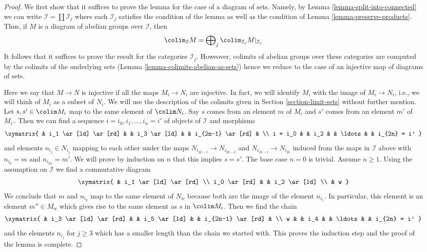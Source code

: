 \begin{proof}
We first show that it suffices to prove the lemma for the case of
a diagram of sets. Namely, by Lemma \ref{lemma-split-into-connected}
we can write $\mathcal{I} = \coprod \mathcal{I}_j$ where each
$\mathcal{I}_j$ satisfies the condition of the lemma as well as the
condition of Lemma \ref{lemma-preserve-products}.
Thus, if $M$ is a diagram of abelian groups over $\mathcal{I}$, then
$$
\colim_\mathcal{I} M =
\bigoplus\nolimits_j \colim_{\mathcal{I}_j} M|_{\mathcal{I}_j}
$$
It follows that it suffices to prove the result for the categories
$\mathcal{I}_j$. Howeover, colimits of abelian groups over these categories 
are computed by the colimits of the underlying sets
(Lemma \ref{lemma-colimits-abelian-as-sets})
hence we reduce to the case of an injective map of diagrams of sets.

\medskip\noindent
Here we say that $M \to N$ is injective if all the maps $M_i \to N_i$
are injective. In fact, we will identify $M_i$ with the image of
$M_i \to N_i$, i.e., we will think of $M_i$ as a subset of $N_i$.
We will use the description of the colimits given in
Section \ref{section-limit-sets} without further mention.
Let $s, s' \in \colim M_i$ map to the same element of $\colim N_i$.
Say $s$ comes from an element $m$ of $M_i$ and $s'$ comes from an
element $m'$ of $M_{i'}$. Then we can find a sequence
$i = i_0, i_1, \ldots, i_n = i'$ of objects of $\mathcal{I}$
and morphisms
$$
\xymatrix{
&
i_1 \ar[ld] \ar[rd] & &
i_3 \ar[ld] & &
i_{2n-1} \ar[rd] & \\
i = i_0 & &
i_2 & &
\ldots & &
i_{2n} = i'
}
$$
and elements $n_{i_j} \in N_{i_j}$ mapping to each other under
the maps $N_{i_{2k-1}} \to N_{i_{2k-2}}$ and $N_{i_{2k-1}}
\to N_{i_{2k}}$ induced from the maps in $\mathcal{I}$ above
with $n_{i_0} = m$ and $n_{i_{2n}} = m'$. We will prove by induction
on $n$ that this implies $s = s'$. The base case $n = 0$ is trivial.
Assume $n \geq 1$. Using the assumption on $\mathcal{I}$
we find a commutative diagram
$$
\xymatrix{
& i_1 \ar[ld] \ar[rd] \\
i_0 \ar[rd] & & i_2 \ar[ld] \\
& w
}
$$
We conclude that $m$ and $n_{i_2}$ map to the same element of $N_w$
because both are the image of the element $n_{i_1}$.
In particular, this element is an element $m'' \in M_w$ which
gives rise to the same element as $s$ in $\colim M_i$.
Then we find the chain
$$
\xymatrix{
&
i_3 \ar[ld] \ar[rd] & &
i_5 \ar[ld] & &
i_{2n-1} \ar[rd] & \\
w & &
i_4 & &
\ldots & &
i_{2n} = i'
}
$$
and the elements $n_{i_j}$ for $j \geq 3$ which has a smaller length
than the chain we started with. This proves the induction step and the
proof of the lemma is complete.
\end{proof}




